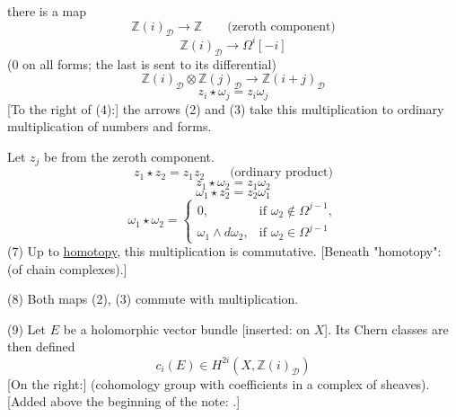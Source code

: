there is a map
\begin{equation*}
\mathbb{Z}(i)_{\mathcal D}\longrightarrow\mathbb{Z}
\qquad\text{(zeroth component)}\tag{2}
\end{equation*}
\begin{equation*}
\mathbb{Z}(i)_{\mathcal D}\longrightarrow\Omega^i[-i]\tag{3}
\end{equation*}
(0 on all forms; the last is sent to its differential)
\begin{equation*}
\mathbb{Z}(i)_{\mathcal D}\otimes\mathbb{Z}(j)_{\mathcal D}
\longrightarrow\mathbb{Z}(i+j)_{\mathcal D}\tag{4}
\end{equation*}
\begin{equation*}
z_i\star\omega_j=z_i\omega_j
\end{equation*}
[To the right of (4):] the arrows (2) and (3) take this multiplication to ordinary multiplication of numbers and forms.

Let $z_j$ be from the zeroth component.
\begin{equation*}
z_1\star z_2=z_1z_2\qquad\text{(ordinary product)}\tag{5'}
\end{equation*}
\begin{equation*}
z_1\star\omega_2=z_1\omega_2\tag{5''}
\end{equation*}
\begin{equation*}
\omega_1\star z_2=z_2\omega_1\tag{5'''}
\end{equation*}
\begin{equation*}
\omega_1\star\omega_2=
\begin{cases}
0, & \text{if }\omega_2\notin\Omega^{j-1},\\
\omega_1\wedge d\omega_2, & \text{if }\omega_2\in\Omega^{j-1}
\end{cases}\tag{6}
\end{equation*}
(7) Up to \underline{homotopy}, this multiplication is commutative.
[Beneath "homotopy": (of chain complexes).]

(8) Both maps (2), (3) commute with multiplication.

(9) Let $E$ be a holomorphic vector bundle [inserted: on $X$]. Its Chern classes are then defined
\begin{equation*}
c_i(E)\in H^{2i}(X,\mathbb{Z}(i)_{\mathcal D})
\end{equation*}
[On the right:] (cohomology group with coefficients in a complex of sheaves).
[Added above the beginning of the note:
.]

